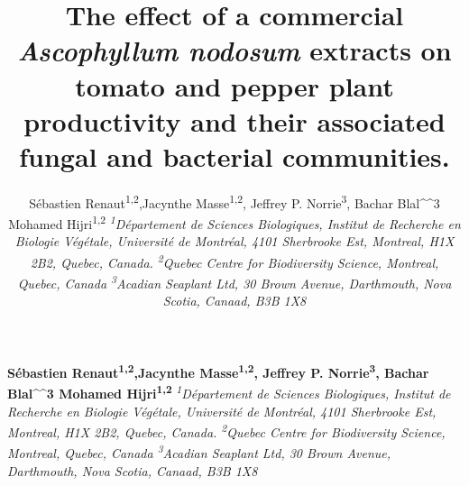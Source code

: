 \documentclass[11pt,]{article}
\title{\textbf{The effect of a commercial \emph{Ascophyllum nodosum} extracts
on tomato and pepper plant productivity and their associated fungal and
bacterial communities.}  }
\author{\Large Sébastien Renaut\textsuperscript{1,2},Jacynthe
Masse\textsuperscript{1,2}, Jeffrey P. Norrie\textsuperscript{3}, Bachar
Blal\^{}\^{}3 Mohamed Hijri\textsuperscript{1,2}\vspace{0.05in} \newline\normalsize\emph{\textsuperscript{1}Département de Sciences Biologiques, Institut de
Recherche en Biologie Végétale, Université de Montréal, 4101 Sherbrooke
Est, Montreal, H1X 2B2, Quebec, Canada. \textsuperscript{2}Quebec Centre
for Biodiversity Science, Montreal, Quebec, Canada
\textsuperscript{3}Acadian Seaplant Ltd, 30 Brown Avenue, Darthmouth,
Nova Scotia, Canaad, B3B 1X8}  }
\date{}
\newcommand*{\authorfont}{\fontfamily{phv}\selectfont}
\begin{document}
	
%

{%
\setlength{\parindent}{0pt}
\thispagestyle{plain}
{\fontsize{18}{20}\selectfont\raggedright 
\maketitle  %

}

{
   \vskip 13.5pt\relax \normalsize\fontsize{11}{12} 
\textbf{\authorfont Sébastien Renaut\textsuperscript{1,2},Jacynthe
Masse\textsuperscript{1,2}, Jeffrey P. Norrie\textsuperscript{3}, Bachar
Blal\^{}\^{}3 Mohamed Hijri\textsuperscript{1,2}} \hskip 15pt \emph{\small \textsuperscript{1}Département de Sciences Biologiques, Institut de
Recherche en Biologie Végétale, Université de Montréal, 4101 Sherbrooke
Est, Montreal, H1X 2B2, Quebec, Canada. \textsuperscript{2}Quebec Centre
for Biodiversity Science, Montreal, Quebec, Canada
\textsuperscript{3}Acadian Seaplant Ltd, 30 Brown Avenue, Darthmouth,
Nova Scotia, Canaad, B3B 1X8}   

}

}
\end{document}
